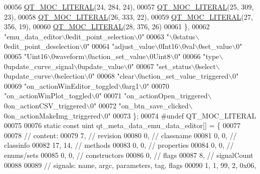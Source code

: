 \begin{DoxyCode}
00056 \hyperlink{a00065_a75bb9482d242cde0a06c9dbdc6b83abe}{QT\_MOC\_LITERAL}(24, 284, 24),
00057 \hyperlink{a00065_a75bb9482d242cde0a06c9dbdc6b83abe}{QT\_MOC\_LITERAL}(25, 309, 23),
00058 \hyperlink{a00065_a75bb9482d242cde0a06c9dbdc6b83abe}{QT\_MOC\_LITERAL}(26, 333, 22),
00059 \hyperlink{a00065_a75bb9482d242cde0a06c9dbdc6b83abe}{QT\_MOC\_LITERAL}(27, 356, 19),
00060 \hyperlink{a00065_a75bb9482d242cde0a06c9dbdc6b83abe}{QT\_MOC\_LITERAL}(28, 376, 26)
00061     \},
00062     \textcolor{stringliteral}{"emu\_data\_editor\(\backslash\)0edit\_point\_selection\(\backslash\)0"}
00063     \textcolor{stringliteral}{"\(\backslash\)0status\(\backslash\)0edit\_point\_deselection\(\backslash\)0"}
00064     \textcolor{stringliteral}{"adjust\_value\(\backslash\)0Int16\(\backslash\)0val\(\backslash\)0set\_value\(\backslash\)0"}
00065     \textcolor{stringliteral}{"Uint16\(\backslash\)0waveform\(\backslash\)0action\_set\_value\(\backslash\)0Uint8\(\backslash\)0"}
00066     \textcolor{stringliteral}{"type\(\backslash\)0update\_curve\_signal\(\backslash\)0update\_value\(\backslash\)0"}
00067     \textcolor{stringliteral}{"set\_status\(\backslash\)0select\(\backslash\)0update\_curve\(\backslash\)0selection\(\backslash\)0"}
00068     \textcolor{stringliteral}{"clear\(\backslash\)0action\_set\_value\_triggered\(\backslash\)0"}
00069     \textcolor{stringliteral}{"on\_actionWinEditor\_toggled\(\backslash\)0arg1\(\backslash\)0"}
00070     \textcolor{stringliteral}{"on\_actionWinPlot\_toggled\(\backslash\)0"}
00071     \textcolor{stringliteral}{"on\_actionOpen\_triggered\(\backslash\)0on\_actionCSV\_triggered\(\backslash\)0"}
00072     \textcolor{stringliteral}{"on\_btn\_save\_clicked\(\backslash\)0on\_actionMakeImg\_triggered\(\backslash\)0"}
00073 \};
00074 \textcolor{preprocessor}{#undef QT\_MOC\_LITERAL}
00075 
00076 \textcolor{keyword}{static} \textcolor{keyword}{const} uint qt\_meta\_data\_emu\_data\_editor[] = \{
00077 
00078  \textcolor{comment}{// content:}
00079        7,       \textcolor{comment}{// revision}
00080        0,       \textcolor{comment}{// classname}
00081        0,    0, \textcolor{comment}{// classinfo}
00082       17,   14, \textcolor{comment}{// methods}
00083        0,    0, \textcolor{comment}{// properties}
00084        0,    0, \textcolor{comment}{// enums/sets}
00085        0,    0, \textcolor{comment}{// constructors}
00086        0,       \textcolor{comment}{// flags}
00087        8,       \textcolor{comment}{// signalCount}
00088 
00089  \textcolor{comment}{// signals: name, argc, parameters, tag, flags}
00090        1,    1,   99,    2, 0x06,

\end{DoxyCode}
